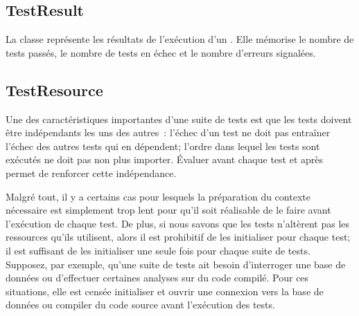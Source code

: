 \documentclass[a4paper,10pt,twoside]{book}
\begin{document}
\subsection{TestResult}

La classe  représente les résultats de
l'exécution d'un . Elle mémorise le nombre de tests
passés, le nombre de tests en échec et le nombre d'erreurs signalées. %

\subsection{TestResource}

Une des caractéristiques importantes d'une suite de tests est que les tests doivent être 
indépendants les uns des autres~: l'échec d'un test ne doit pas entraîner l'échec des 
autres tests qui en dépendent; l'ordre dans lequel les tests sont exécutés ne doit 
pas non plus importer.
Évaluer   avant chaque test et  après permet de renforcer cette indépendance.

Malgré tout, il y a certains cas pour lesquels la préparation du contexte nécessaire est simplement 
trop lent pour qu'il soit réalisable
de le faire avant l'exécution de chaque test. De plus, si nous savons que les tests n'altèrent pas 
les ressources qu'ils utilisent, alors il est prohibitif de les initialiser pour chaque test; il est 
suffisant de les initialiser une seule fois pour chaque suite de tests. Supposez, par exemple, 
qu'une suite de tests ait besoin d'interroger une base de données ou d'effectuer certaines analyses 
sur du code compilé.
Pour ces situations, elle est censée initialiser et ouvrir une connexion vers la base de données 
ou compiler du code source avant l'exécution des tests.
\end{document}
